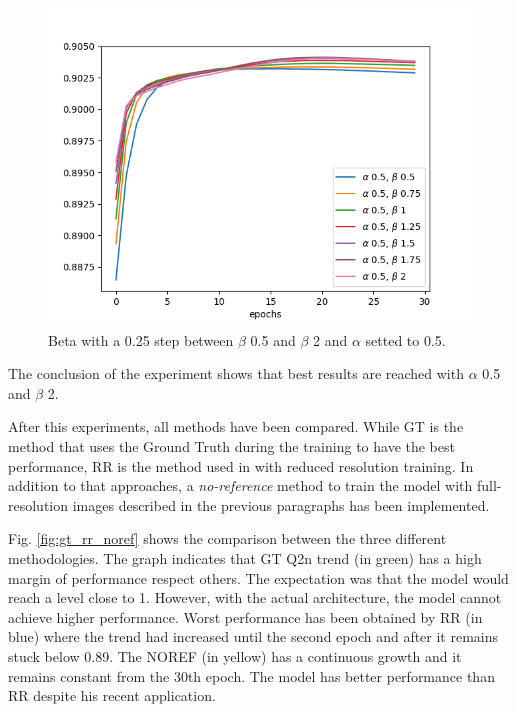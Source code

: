 \documentclass[12pt]{report}
\begin{document}
\begin{figure}
    \centering
    \includegraphics[scale=.7]{alpha_beta3.png}
    \caption{Beta with a 0.25 step between $\beta$ 0.5 and $\beta$ 2 and $\alpha$ setted to 0.5.}
    \label{fig:alpha_beta3}
\end{figure}

The conclusion of the experiment shows that best results are reached with $\alpha$ 0.5 and $\beta$ 2.

After this experiments, all methods have been compared.
While GT is the method that uses the Ground Truth during the training to have the best performance,
RR is the method used in \cite{pnn} with reduced resolution training. 
In addition to that approaches, a \textit{no-reference} method to train the model
with full-resolution images described in the previous paragraphs has been implemented.

Fig. \ref{fig:gt_rr_noref} shows the comparison between the three different methodologies. 
The graph indicates that GT Q2n trend (in green) has a high margin of performance respect others. The expectation was that the model would reach a level close to 1. However, with the actual architecture, the model cannot achieve higher performance.
Worst performance has been obtained by RR (in blue) where the trend had increased until the second epoch and after it remains stuck below 0.89. 
The NOREF (in yellow) has a continuous growth and it remains constant from the 30th epoch. 
The model has better performance than RR despite his recent application.
\end{document}
